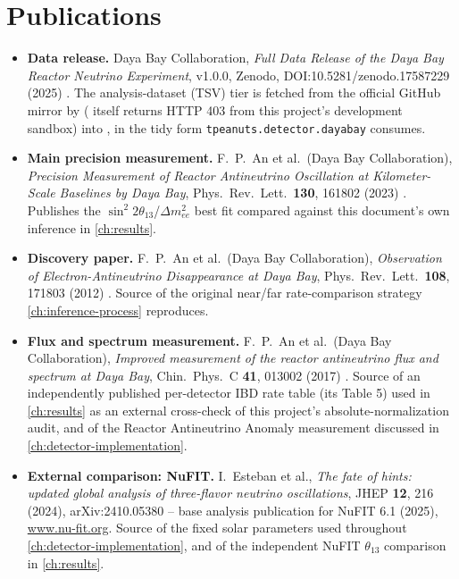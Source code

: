 \label{ch:data-release}

\section{Publications}

\begin{refbox}
\begin{itemize}
  \item \textbf{Data release.} Daya Bay Collaboration, \emph{Full Data
    Release of the Daya Bay Reactor Neutrino Experiment}, v1.0.0, Zenodo,
    DOI:10.5281/zenodo.17587229 (2025) \parencite{DayaBayZenodo2025}. The
    analysis-dataset (TSV) tier is fetched from the official GitHub mirror
     by
    ( itself returns HTTP 403 from this project's
    development sandbox) into , in the tidy
     form \texttt{tpeanuts.detector.dayabay} consumes.
  \item \textbf{Main precision measurement.} F.~P.~An et al.\ (Daya Bay
    Collaboration), \emph{Precision Measurement of Reactor Antineutrino
    Oscillation at Kilometer-Scale Baselines by Daya Bay}, Phys.\ Rev.\
    Lett.\ \textbf{130}, 161802 (2023) \parencite{An2023DayaBayPrecision}.
    Publishes the $\sin^2 2\theta_{13}$/$\Delta m^2_{ee}$ best fit compared
    against this document's own inference in \cref{ch:results}.
  \item \textbf{Discovery paper.} F.~P.~An et al.\ (Daya Bay
    Collaboration), \emph{Observation of Electron-Antineutrino
    Disappearance at Daya Bay}, Phys.\ Rev.\ Lett.\ \textbf{108}, 171803
    (2012) \parencite{An2012DayaBayDiscovery}. Source of the original
    near/far rate-comparison strategy \cref{ch:inference-process}
    reproduces.
  \item \textbf{Flux and spectrum measurement.} F.~P.~An et al.\ (Daya Bay
    Collaboration), \emph{Improved measurement of the reactor antineutrino
    flux and spectrum at Daya Bay}, Chin.\ Phys.\ C \textbf{41}, 013002
    (2017) \parencite{An2017DayaBayFluxSpectrum}. Source of an
    independently published per-detector IBD rate table (its Table 5) used
    in \cref{ch:results} as an external cross-check of this project's
    absolute-normalization audit, and of the Reactor Antineutrino Anomaly
    measurement discussed in \cref{ch:detector-implementation}.
  \item \textbf{External comparison: NuFIT.} I.~Esteban et al., \emph{The
    fate of hints: updated global analysis of three-flavor neutrino
    oscillations}, JHEP \textbf{12}, 216 (2024), arXiv:2410.05380
    \parencite{EstebanNuFit2024} -- base analysis publication for NuFIT 6.1
    (2025), \url{www.nu-fit.org}. Source of the fixed solar parameters used
    throughout \cref{ch:detector-implementation}, and of the independent
    NuFIT $\theta_{13}$ comparison in \cref{ch:results}.
\end{itemize}
\end{refbox}

